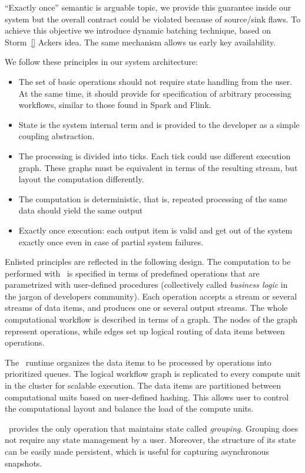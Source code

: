 ``Exactly once'' semantic is arguable topic, we provide this guarantee inside our system but the overall contract could be violated because of source/sink flaws. To achieve this objective we introduce dynamic batching technique, based on Storm~\ref{} Ackers idea. The same mechanism allows us early key availability. 

We follow these principles in our system architecture:
\begin{itemize}
\item The set of basic operations should not require state handling from the user. At the same time, it should provide for specification of arbitrary processing workflows, similar to those found in Spark and Flink.
\item State is the system internal term and is provided to the developer as a simple coupling abstraction.
\item The processing is divided into ticks. Each tick could use different execution graph. These graphs must be equivalent in terms of the resulting stream, but layout the computation differently.
\item The computation is deterministic, that is, repeated processing of the same data should yield the same output
\item Exactly once execution: each output item is valid and get out of the system exactly once even in case of partial system failures.
\end{itemize}

Enlisted principles are reflected in the following design. The computation to be performed with \FlameStream\ is specified in terms of predefined operations that are parametrized with user-defined procedures (collectively called {\em business logic} in the jargon of developers community). Each operation accepts a stream or several streams of data items, and produces one or several output streams. The whole computational workflow is described in terms of a graph. The nodes of the graph represent operations, while edges set up logical routing of data items between operations.

The \FlameStream\ runtime organizes the data items to be processed by operations into prioritized queues. The logical workflow graph is replicated to every compute unit in the cluster for scalable execution. The data items are partitioned between computational units based on user-defined hashing. This allows user to control the computational layout and balance the load of the compute units.

\FlameStream\ provides the only operation that maintains state called {\it grouping}. Grouping does not require any state management by a user. Moreover, the structure of its state can be easily made persistent, which is useful for capturing asynchronous snapshots.

